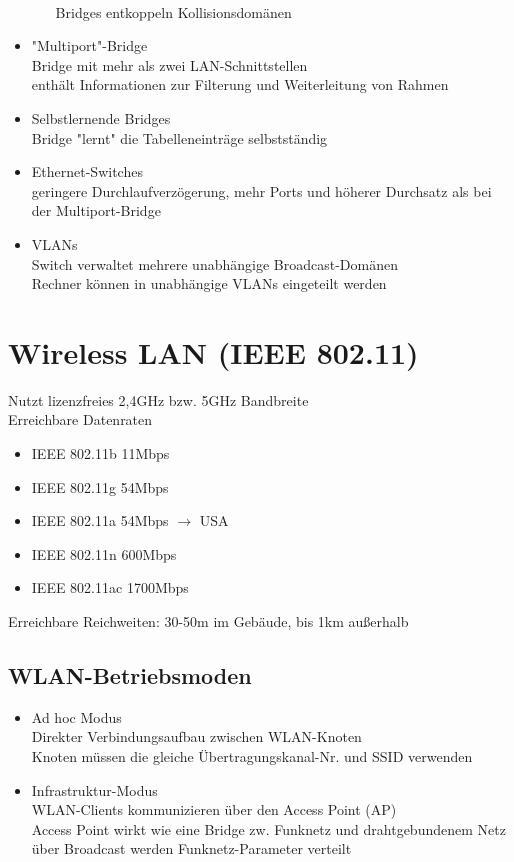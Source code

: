 \documentclass{scrreprt}
\begin{document}
\begin{itemize}
\begin{itemize}
		\\Bridges entkoppeln Kollisionsdomänen
	\end{itemize}
	\item "Multiport"-Bridge
	\\Bridge mit mehr als zwei LAN-Schnittstellen
	\\enthält Informationen zur Filterung und Weiterleitung von Rahmen
	\item Selbstlernende Bridges
	\\Bridge "lernt" die Tabelleneinträge selbstständig
	\item Ethernet-Switches
	\\geringere Durchlaufverzögerung, mehr Ports und höherer Durchsatz als bei der Multiport-Bridge
	\item VLANs
	\\Switch verwaltet mehrere unabhängige Broadcast-Domänen
	\\Rechner können in unabhängige VLANs eingeteilt werden
\end{itemize}
\section{Wireless LAN (IEEE 802.11)}
Nutzt lizenzfreies 2,4GHz bzw. 5GHz Bandbreite
\\Erreichbare Datenraten
\begin{itemize}
	\item IEEE 802.11b \tab 11Mbps
 	\item IEEE 802.11g \tab 54Mbps
	\item IEEE 802.11a \tab 54Mbps $\rightarrow$ USA
	\item IEEE 802.11n \tab 600Mbps
	\item IEEE 802.11ac \tab 1700Mbps
\end{itemize}
Erreichbare Reichweiten: 30-50m im Gebäude, bis 1km außerhalb
\subsection{WLAN-Betriebsmoden}
\begin{itemize}
	\item Ad hoc Modus
	\\Direkter Verbindungsaufbau zwischen WLAN-Knoten
	\\Knoten müssen die gleiche Übertragungskanal-Nr. und SSID verwenden
	\item Infrastruktur-Modus
	\\WLAN-Clients kommunizieren über den Access Point (AP)
	\\Access Point wirkt wie eine Bridge zw. Funknetz und drahtgebundenem Netz
	\\über Broadcast werden Funknetz-Parameter verteilt
\end{itemize}
\end{document}
